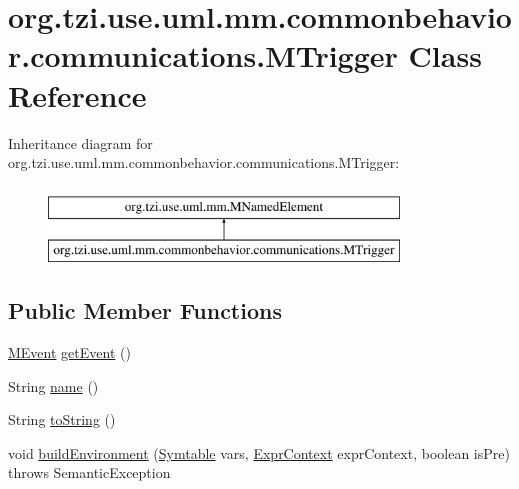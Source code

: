 \hypertarget{classorg_1_1tzi_1_1use_1_1uml_1_1mm_1_1commonbehavior_1_1communications_1_1_m_trigger}{\section{org.\-tzi.\-use.\-uml.\-mm.\-commonbehavior.\-communications.\-M\-Trigger Class Reference}
\label{classorg_1_1tzi_1_1use_1_1uml_1_1mm_1_1commonbehavior_1_1communications_1_1_m_trigger}
}
Inheritance diagram for org.\-tzi.\-use.\-uml.\-mm.\-commonbehavior.\-communications.\-M\-Trigger\-:\begin{figure}[H]
\begin{center}
\leavevmode
\includegraphics[height=2.000000cm]{classorg_1_1tzi_1_1use_1_1uml_1_1mm_1_1commonbehavior_1_1communications_1_1_m_trigger}
\end{center}
\end{figure}
\subsection*{Public Member Functions}
\begin{DoxyCompactItemize}
\item 
\hyperlink{classorg_1_1tzi_1_1use_1_1uml_1_1mm_1_1commonbehavior_1_1communications_1_1_m_event}{M\-Event} \hyperlink{classorg_1_1tzi_1_1use_1_1uml_1_1mm_1_1commonbehavior_1_1communications_1_1_m_trigger_a37b1955ab25a26c10637edda4f0b9bcc}{get\-Event} ()
\item 
String \hyperlink{classorg_1_1tzi_1_1use_1_1uml_1_1mm_1_1commonbehavior_1_1communications_1_1_m_trigger_a6bacd4010c1096589de7a8e64c2091b1}{name} ()
\item 
String \hyperlink{classorg_1_1tzi_1_1use_1_1uml_1_1mm_1_1commonbehavior_1_1communications_1_1_m_trigger_ab9c954048a81d53df27a1dcfdc2a6da2}{to\-String} ()
\item 
void \hyperlink{classorg_1_1tzi_1_1use_1_1uml_1_1mm_1_1commonbehavior_1_1communications_1_1_m_trigger_a2b9f156a446a5ddfa78ce317f9042d48}{build\-Environment} (\hyperlink{classorg_1_1tzi_1_1use_1_1parser_1_1_symtable}{Symtable} vars, \hyperlink{classorg_1_1tzi_1_1use_1_1parser_1_1_expr_context}{Expr\-Context} expr\-Context, boolean is\-Pre)  throws Semantic\-Exception 
\end{DoxyCompactItemize}
